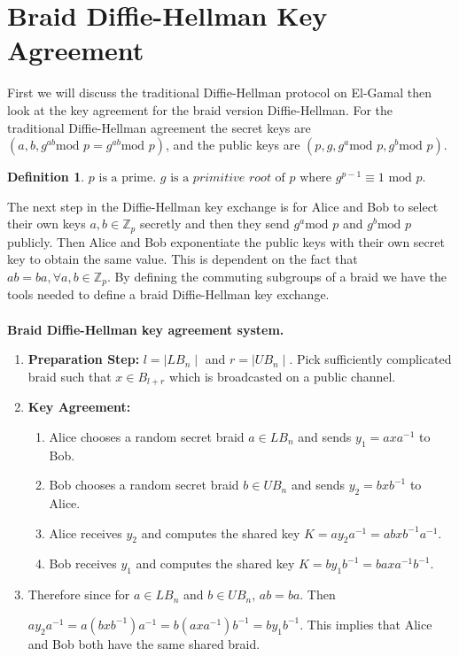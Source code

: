 \documentclass{article}
\theoremstyle{definition}
\newtheorem{definition}{Definition}[section]
\begin{document}
\section{Braid Diffie-Hellman Key Agreement}
First we will discuss the traditional Diffie-Hellman protocol on El-Gamal then look at the key agreement for the braid version Diffie-Hellman. For the traditional Diffie-Hellman agreement the secret keys are $(a,b,g^{ab} \text{mod }p=g^{ab} \text{mod }p)$, and the public keys are $(p,g,g^a \text{mod }p,g^b \text{mod }p)$. 

\begin{definition}
$p \text{ is a prime. } g \text{ is a }\textit{primitive root } \text{of }p \text{ where }g^{p-1}\equiv 1 \text{ mod }p. $
\end{definition}

The next step in the Diffie-Hellman key exchange is for Alice and Bob to select their own keys $a,b \in \mathbb{Z}_p$  secretly and then they send $g^a \text{mod }p$ and $g^b \text{mod }p$ publicly. Then Alice and Bob exponentiate the public keys with their own secret key to obtain the same value. This is dependent on the fact that $ab=ba,  \forall a,b \in \mathbb{Z}_p$. By defining the commuting subgroups of a braid we have the tools needed to define a braid Diffie-Hellman key exchange. 
\\ \\
\textbf{Braid Diffie-Hellman key agreement system.}
\begin{enumerate}

\item \textbf{Preparation Step:} $l=\mid LB_n \mid$ and $r=\mid UB_n \mid$. Pick sufficiently complicated braid such that $x \in B_{l+r}$ which is broadcasted on a public channel. 

\item \textbf{Key Agreement:} 
	 \begin{enumerate}
	 	\item Alice chooses a random secret braid $a \in LB_n$ and sends $y_1=axa^{-1}$ to Bob.
		\item Bob chooses a random secret braid $b \in UB_n$ and sends $y_2=bxb^{-1}$ to Alice.
		\item Alice receives $y_2$ and computes the shared key $K=ay_2a^{-1}=abxb^{-1}a^{-1}$.
		\item Bob receives $y_1$ and computes the shared key $K=by_1b^{-1}=baxa^{-1}b^{-1}$.
	 \end{enumerate}
\item Therefore since for $a \in LB_n$ and $b \in UB_n$, $ab=ba$. Then
\begin{centering}
$ay_2a^{-1}=a(bxb^{-1})a^{-1}=b(axa^{-1})b^{-1}=by_1b^{-1}$. This implies that Alice and Bob both have the same shared braid.
\end{centering}
\end{enumerate}
\end{document}
